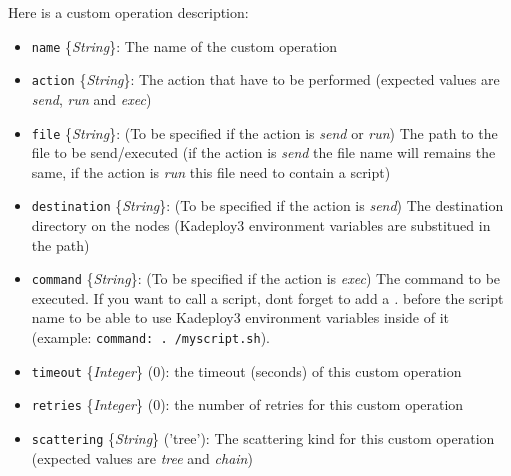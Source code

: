 \documentclass[a4wide,10pt,oneside]{book}
\newcommand{\yfield}[2]{\texttt{#1} {\small\{{\emph{#2}}\}}:}
\newcommand{\yfieldd}[3]{\texttt{#1} {\small\{{\emph{#2}}\}} {\small(}#3{\small)}:}
\begin{document}
Here is a custom operation description:
\begin{itemize}
  \item \yfield{name}{String} The name of the custom operation
  \item \yfield{action}{String} The action that have to be performed (expected values are \emph{send}, \emph{run} and \emph{exec})
  \item \yfield{file}{String} \small{(To be specified if the action is \emph{send} or \emph{run})} The path to the file to be send/executed (if the action is \emph{send} the file name will remains the same, if the action is \emph{run} this file need to contain a script)
  \item \yfield{destination}{String} \small{(To be specified if the action is \emph{send})} The destination directory on the nodes (Kadeploy3 environment variables are substitued in the path)
  \item \yfield{command}{String} \small{(To be specified if the action is \emph{exec})} The command to be executed. If you want to call a script, dont forget to add a \emph{.} before the script name to be able to use Kadeploy3 environment variables inside of it (example: \texttt{command: . /myscript.sh}).
  \item \yfieldd{timeout}{Integer}{0} the timeout (seconds) of this custom operation
  \item \yfieldd{retries}{Integer}{0} the number of retries for this custom operation
  \item \yfieldd{scattering}{String}{'tree'} The scattering kind for this custom operation (expected values are \emph{tree} and \emph{chain})
\end{itemize} 
\end{document}
